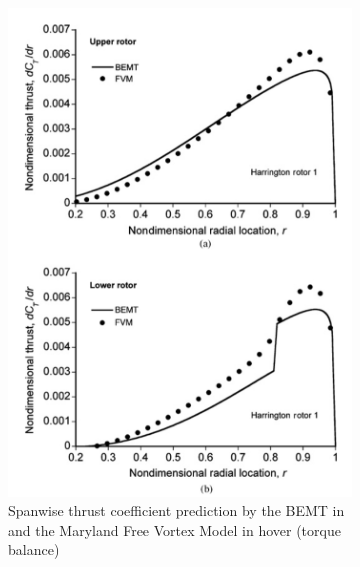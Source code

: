 \begin{figure}
\captionsetup[subfigure]{justification=centering}
\begin{subfigure}[t]{0.5\textwidth}
    \centering
    \includegraphics[width=\textwidth]{Figures/Leishman_CT.png}
    \caption{Spanwise thrust coefficient prediction by the BEMT in \cite{BEMT} and the Maryland Free Vortex Model in hover (torque balance)}
\end{subfigure}
\begin{subfigure}[t]{0.5\textwidth}
    \centering

\end{subfigure}
\end{figure}
